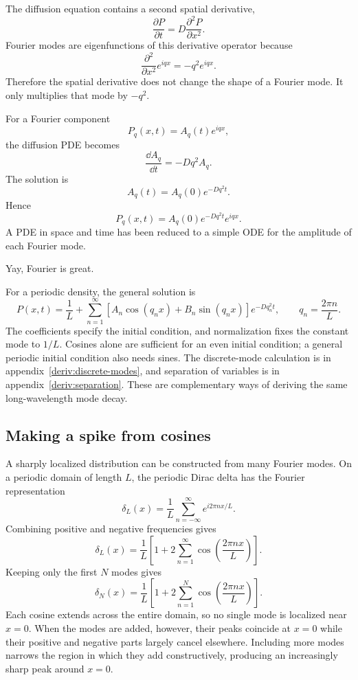 The diffusion equation contains a second spatial derivative,
% 
\[
    \frac{\partial P}{\partial t} = D\frac{\partial^2P}{\partial x^2}.
\]
% 
Fourier modes are eigenfunctions of this derivative operator because
% 
\[
    \frac{\partial^2}{\partial x^2}e^{iqx} = -q^2e^{iqx}.
\]
% 
Therefore the spatial derivative does not change the shape of a Fourier mode.
It only multiplies that mode by $-q^2$.

For a Fourier component
% 
\[
    P_q(x,t)=A_q(t)e^{iqx},
\]
% 
the diffusion PDE becomes
% 
\[
    \frac{\dd A_q}{\dd t} = -Dq^2A_q.
\]
% 
The solution is
% 
\[
    A_q(t)=A_q(0)e^{-Dq^2t}.
\]
% 
Hence
% 
\[
    \boxed{P_q(x,t)=A_q(0)e^{-Dq^2t}e^{iqx}.}
\]
% 
A PDE in space and time has been reduced to a simple ODE for the amplitude of each Fourier mode.

Yay, Fourier is great.


For a periodic density, the general solution is
\[
    P(x,t)=\frac{1}{L}+\sum_{n=1}^{\infty}\left[A_n\cos(q_nx)+B_n\sin(q_nx)\right]e^{-Dq_n^2t},\qquad q_n=\frac{2\pi n}{L}.
\]
The coefficients specify the initial condition, and normalization fixes the constant mode to $1/L$.
Cosines alone are sufficient for an even initial condition; a general periodic initial condition also needs sines.
The discrete-mode calculation is in appendix~\ref{deriv:discrete-modes}, and separation of variables is in appendix~\ref{deriv:separation}.
These are complementary ways of deriving the same long-wavelength mode decay.
\subsection{Making a spike from cosines}
\label{sec:spike}



A sharply localized distribution can be constructed from many Fourier modes.
On a periodic domain of length $L$, the periodic Dirac delta has the Fourier representation
% 
\[
    \boxed{ \delta_L(x) = \frac{1}{L} \sum_{n=-\infty}^{\infty} e^{i2\pi nx/L}. }
\]
% 
Combining positive and negative frequencies gives
% 
\[
    \boxed{ \delta_L(x) = \frac{1}{L} \left[ 1 + 2\sum_{n=1}^{\infty} \cos\left( \frac{2\pi n x}{L} \right) \right]. }
\]
% 
Keeping only the first $N$ modes gives
% 
\[
    \delta_N(x) = \frac{1}{L} \left[ 1 + 2\sum_{n=1}^{N} \cos\left( \frac{2\pi n x}{L} \right) \right].
\]
% 
Each cosine extends across the entire domain, so no single mode is localized near $x=0$.
When the modes are added, however, their peaks coincide at $x=0$ while their positive and negative parts largely cancel elsewhere.
Including more modes narrows the region in which they add constructively, producing an increasingly sharp peak around $x=0$.


